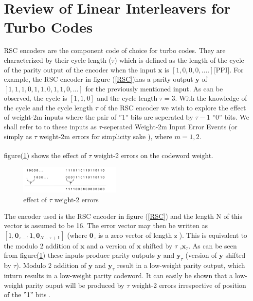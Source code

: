\documentclass[twocolumn]{article}
\begin{document}
\section{Review of Linear Interleavers for Turbo Codes}
 RSC encoders are the component code of choice for turbo codes. They are
characterized by their cycle length ($\tau$) which is defined as the length of the cycle
 of the parity output of the encoder when the input $\mathbf{x}$ is $[1,0,0,0,....]$[PPI]. 
For example, the RSC encoder in figure (\ref{RSC})has a parity output $\mathbf{y}$ of 
$[1,1,1,0,1,1,0,1,1,0,...]$
for the previously mentioned input. As can be observed, the cycle is $[1,1,0]$ and
the cycle length $\tau=3$. With the knowledge of the cycle and the cycle length $\tau$
of the RSC encoder we wish to explore the effect of weight-2m inputs where the pair of
''1'' bits
 are seperated by $\tau-1$ ''0'' bits. We shall refer to to these inputs as
 $\tau$-seperated Weight-2m Input Error Events (or simply as $\tau$ weight-2m errors for
 simplicity sake ), where $m={1,2}$. 

\paragraph{}
 figure(\ref{RSC3})  shows the effect of $\tau$ weight-2 errors on the codeword weight.
 
\begin{figure}[h!]
\centering
		\includegraphics[width=0.45\textwidth]{RSCExample.pdf}
		\caption{ effect of $\tau$ weight-2 errors}
		\label{RSC3}
		\end{figure}
	
 The encoder used is the RSC encoder in figure (\ref{RSC})
  and the length N of this vector is assumed to 
be 16. The error vector may then be written as $[1, \mathbf{0}_{\tau-1} 1, \mathbf{0}_{N-\tau+1}]$
(where $\mathbf{0}_z$ is a zero vector of length z ).
This is equivalent to the modulo 2 addition of $\mathbf{x}$ and a version of
 $\mathbf{x}$ shifted by $\tau$ ,$\mathbf{x}_{\tau}$. As can be seen from 
figure(\ref{RSC3}) these inputs produce parity outputs $\mathbf{y}$ and $\mathbf{y}_{\tau}$
(version of $\mathbf{y}$ shifted by $\tau$). Modulo 2 addition of $\mathbf{y}$ and
$\mathbf{y}_{\tau}$ result in a low-weight parity output, which inturn results
in a low-weight parity codeword. It can easily be shown that a low-weight parity ouput
will be produced by $\tau$ weight-2 errors irrespective of position of the ''1'' bits . 
\end{document}
